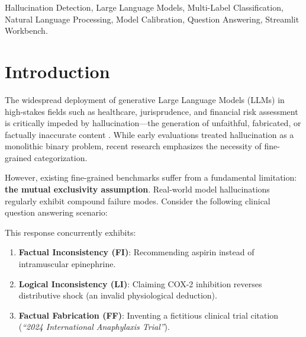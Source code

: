 \documentclass[conference]{IEEEtran}
\begin{document}
\begin{IEEEkeywords}
Hallucination Detection, Large Language Models, Multi-Label Classification, Natural Language Processing, Model Calibration, Question Answering, Streamlit Workbench.
\end{IEEEkeywords}

\section{Introduction}
\label{sec:introduction}
The widespread deployment of generative Large Language Models (LLMs) in high-stakes fields such as healthcare, jurisprudence, and financial risk assessment is critically impeded by hallucination—the generation of unfaithful, fabricated, or factually inaccurate content \cite{saxena2025, min2023factscore}. While early evaluations treated hallucination as a monolithic binary problem, recent research emphasizes the necessity of fine-grained categorization.

However, existing fine-grained benchmarks suffer from a fundamental limitation: \textbf{the mutual exclusivity assumption}. Real-world model hallucinations regularly exhibit compound failure modes. Consider the following clinical question answering scenario:

\vspace{0.4em}
\noindent{}
\vspace{0.4em}

\noindent This response concurrently exhibits:
\begin{enumerate}
    \item \textbf{Factual Inconsistency (FI)}: Recommending aspirin instead of intramuscular epinephrine.
    \item \textbf{Logical Inconsistency (LI)}: Claiming COX-2 inhibition reverses distributive shock (an invalid physiological deduction).
    \item \textbf{Factual Fabrication (FF)}: Inventing a fictitious clinical trial citation (\textit{``2024 International Anaphylaxis Trial''}).
\end{enumerate}
\end{document}
